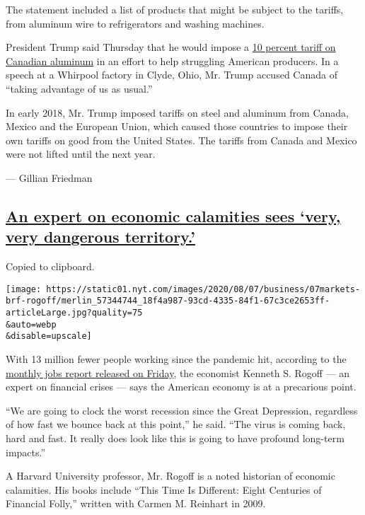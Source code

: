 The statement included a list of products that might be subject to the
tariffs, from aluminum wire to refrigerators and washing machines.

President Trump said Thursday that he would impose a
\href{https://www.nytimes.com/2020/08/06/business/economy/trump-canadian-aluminum-tariffs.html}{10
percent tariff on Canadian aluminum} in an effort to help struggling
American producers. In a speech at a Whirpool factory in Clyde, Ohio,
Mr. Trump accused Canada of ``taking advantage of us as usual.''

In early 2018, Mr. Trump imposed tariffs on steel and aluminum from
Canada, Mexico and the European Union, which caused those countries to
impose their own tariffs on good from the United States. The tariffs
from Canada and Mexico were not lifted until the next year.

--- Gillian Friedman

\hypertarget{an-expert-on-economic-calamities-sees-very-very-dangerous-territory}{%
\subsection{\texorpdfstring{\protect\hyperlink{an-expert-on-economic-calamities-sees-very-very-dangerous-territory}{An
expert on economic calamities sees `very, very dangerous
territory.'}}{An expert on economic calamities sees `very, very dangerous territory.'}}\label{an-expert-on-economic-calamities-sees-very-very-dangerous-territory}}

Copied to clipboard.

\texttt{[image: https://static01.nyt.com/images/2020/08/07/business/07markets-brf-rogoff/merlin\_57344744\_18f4a987-93cd-4335-84f1-67c3ce2653ff-articleLarge.jpg?quality=75\\\&auto=webp\\\&disable=upscale]}

With 13 million fewer people working since the pandemic hit, according
to the \href{https://www.bls.gov/news.release/empsit.nr0.htm}{monthly
jobs report released on Friday}, the economist Kenneth S. Rogoff --- an
expert on financial crises --- says the American economy is at a
precarious point.

``We are going to clock the worst recession since the Great Depression,
regardless of how fast we bounce back at this point,'' he said. ``The
virus is coming back, hard and fast. It really does look like this is
going to have profound long-term impacts.''

A Harvard University professor, Mr. Rogoff is a noted historian of
economic calamities. His books include ``This Time Is Different: Eight
Centuries of Financial Folly,'' written with Carmen M. Reinhart in 2009.

